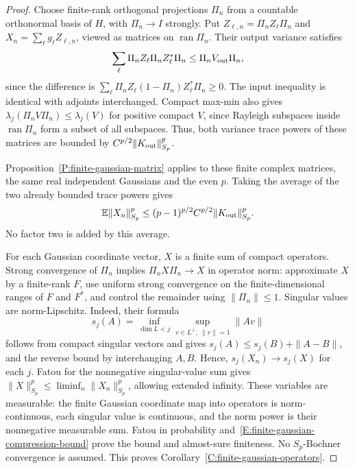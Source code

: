 \begin{proof}
  Choose finite-rank orthogonal projections $\Pi_n$ from a countable
  orthonormal basis of $H$, with $\Pi_n\to I$ strongly. Put
  $Z_{\ell,n}=\Pi_nZ_\ell\Pi_n$ and $X_n=\sum_\ell g_\ell Z_{\ell,n}$,
  viewed as matrices on $\operatorname{ran}\Pi_n$. Their output variance
  satisfies
  \[
    \sum_\ell\Pi_nZ_\ell\Pi_nZ_\ell^*\Pi_n
    \le\Pi_nV_{\rm out}\Pi_n,
  \]
  since the difference is
  $\sum_\ell\Pi_nZ_\ell(1-\Pi_n)Z_\ell^*\Pi_n\ge0$.
  The input inequality is identical with adjoints interchanged. Compact
  max-min also gives
  $\lambda_j(\Pi_nV\Pi_n)\le\lambda_j(V)$ for positive compact $V$,
  since Rayleigh subspaces inside $\operatorname{ran}\Pi_n$ form a subset
  of all subspaces. Thus, both variance trace powers of these matrices
  are bounded by $C^{p/2}\|K_{\rm out}\|_{S_p}^p$.

  Proposition~\ref{P:finite-gaussian-matrix} applies to these finite
  complex matrices, the same real independent Gaussians and the even $p$.
  Taking the average of the two already bounded trace powers gives
  \begin{equation}\label{E:finite-gaussian-compression-bound}
    \mathbb{E}\|X_n\|_{S_p}^p
    \le(p-1)^{p/2}C^{p/2}\|K_{\rm out}\|_{S_p}^p.
  \end{equation}
  No factor two is added by this average.

  For each Gaussian coordinate vector, $X$ is a finite sum of compact
  operators. Strong convergence of $\Pi_n$ implies $\Pi_nX\Pi_n\to X$
  in operator norm: approximate $X$ by a finite-rank $F$, use uniform
  strong convergence on the finite-dimensional ranges of $F$ and $F^*$,
  and control the remainder using $\|\Pi_n\|\le1$. Singular values are
  norm-Lipschitz. Indeed, their formula
  \[
    s_j(A)=\inf_{\dim L<j}
    \sup_{v\in L^\perp,\ \|v\|=1}\|Av\|
  \]
  follows from compact singular vectors and gives
  $s_j(A)\le s_j(B)+\|A-B\|$, and the reverse bound by interchanging $A,B$.
  Hence, $s_j(X_n)\to s_j(X)$ for each $j$. Fatou for the nonnegative
  singular-value sum gives
  $\|X\|_{S_p}^p\le\liminf_n\|X_n\|_{S_p}^p$, allowing extended infinity.
  These variables are measurable: the finite Gaussian coordinate map
  into operators is norm-continuous, each singular value is continuous,
  and the norm power is their nonnegative measurable sum. Fatou in
  probability and~\eqref{E:finite-gaussian-compression-bound} prove the
  bound and almost-sure finiteness. No $S_p$-Bochner convergence is assumed.
  This proves Corollary~\ref{C:finite-gaussian-operators}.
\end{proof}

